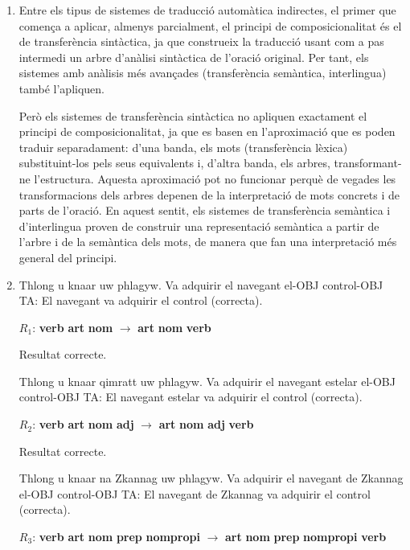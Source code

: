 \begin{enumerate}
  \item Entre els tipus de sistemes de traducció automàtica indirectes, el
      primer que comença a aplicar, almenys parcialment, el principi
      de composicionalitat és el de transferència sintàctica, ja que
      construeix la traducció usant com a pas intermedi  un arbre
      d'anàlisi sintàctica de l'oració original. Per tant, els
      sistemes amb anàlisis més avançades (transferència
      semàntica, interlingua) també l'apliquen. 

      Però els sistemes de transferència sintàctica no apliquen
      exactament el principi de composicionalitat, ja que es basen
      en l'aproximació que es poden traduir separadament: d'una banda, els mots
      (transferència lèxica) substituint-los pels seus equivalents i,
      d'altra banda, els arbres, transformant-ne l'estructura. Aquesta
      aproximació pot no funcionar perquè de vegades les
      transformacions dels arbres depenen de la interpretació de mots
      concrets i de parts de l'oració. En aquest sentit, els sistemes
      de transferència semàntica i d'interlingua proven de construir
      una representació semàntica a partir de l'arbre i de la
      semàntica dels mots, de manera que fan una interpretació més
      general del principi.


    \item 

     \begin{example}
     \gll Thlong u knaar uw phlagyw.
          {Va adquirir} el navegant el-OBJ control-OBJ
     \glt TA: El navegant va adquirir el control (correcta).
     \glend
     \end{example}
     $R_1$: \textbf{verb} \textbf{art} \textbf{nom} $\rightarrow$
     \textbf{art} \textbf{nom} \textbf{verb}

     Resultat correcte.

     \begin{example}
     \gll Thlong u knaar qimratt uw phlagyw.
          {Va adquirir} el navegant estelar el-OBJ control-OBJ
     \glt TA: El navegant estelar va adquirir el control (correcta).
     \glend
     \end{example}
     $R_2$: \textbf{verb} \textbf{art} \textbf{nom} \textbf{adj} $\rightarrow$
     \textbf{art} \textbf{nom} \textbf{adj} \textbf{verb} 
     \begin{example}
 
     Resultat correcte.

     \gll Thlong u knaar na Zkannag uw phlagyw.
          {Va adquirir} el navegant de Zkannag el-OBJ control-OBJ
     \glt TA: El navegant de Zkannag va adquirir el control (correcta).
     \glend
     \end{example}
     $R_3$: \textbf{verb} \textbf{art} \textbf{nom} \textbf{prep}
     \textbf{nompropi} $\rightarrow$ \textbf{art} \textbf{nom}
     \textbf{prep} \textbf{nompropi} \textbf{verb}


\end{enumerate}
